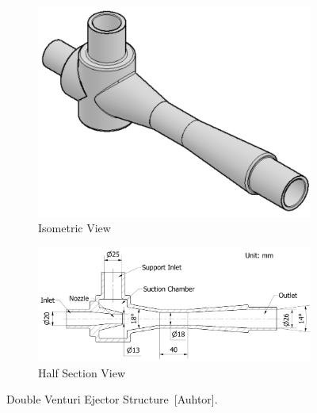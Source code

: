 \begin{figure}[H]
\centering
  \begin{subfigure}{0.5\textwidth}
  \centering
    \includegraphics[width=1\linewidth]{FIGURES/venturi1.png}
    \caption{Isometric View}
  \end{subfigure}
  \begin{subfigure}{0.5\textwidth}
  \hspace{-3cm}
    \includegraphics[width=1.7\linewidth]{FIGURES/venturi2.png}
    \caption{Half Section View}
  \end{subfigure}
  \caption{Double Venturi Ejector Structure~[Auhtor].}
    \label{venturi}
\end{figure}